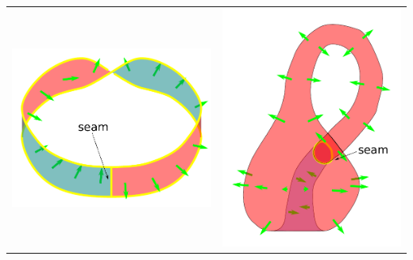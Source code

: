 \begin{tabular}{cc}
\parbox{0.5\textwidth}{
\includegraphics[scale = 0.7]{Multi-structures/Multisurfaces/Mobius_strip}
} & \parbox{0.5\textwidth}{
\includegraphics[scale = 0.5]{Multi-structures/Multisurfaces/Klein_bottle}
}
\end{tabular}

